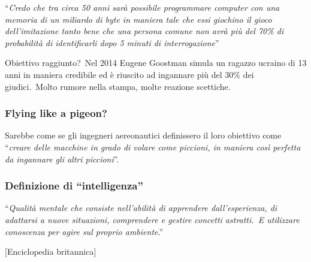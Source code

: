 \vspace{12pt}
\noindent``\textit{Credo che tra circa 50 anni sarà possibile programmare computer con una memoria di un miliardo di byte in maniera tale che essi giochino il gioco dell'imitazione tanto bene che una persona comune non avrà più del 70\% di probabilità di identificarli dopo 5 minuti di interrogazione}''

\vspace{12pt}
\noindent Obiettivo raggiunto?\ Nel 2014 Eugene Goostman simula un ragazzo ucraino di 13 anni in maniera credibile ed è riuscito ad ingannare più del 30\% dei giudici.\
Molto rumore nella stampa, molte reazione scettiche.

\subsubsection{Flying like a pigeon?}

Sarebbe come se gli ingegneri aereonautici definissero il loro obiettivo come ``\textit{creare delle macchine in grado di volare come piccioni, in maniera così perfetta da ingannare gli altri piccioni}''.

\subsubsection{Definizione di ``intelligenza''}

``\textit{Qualità mentale che consiste nell'abilità di apprendere dall'esperienza, di adattarsi a nuove situazioni, comprendere e gestire concetti astratti.\ E utilizzare conoscenza per agire sul proprio ambiente}.''

[Enciclopedia britannica]

